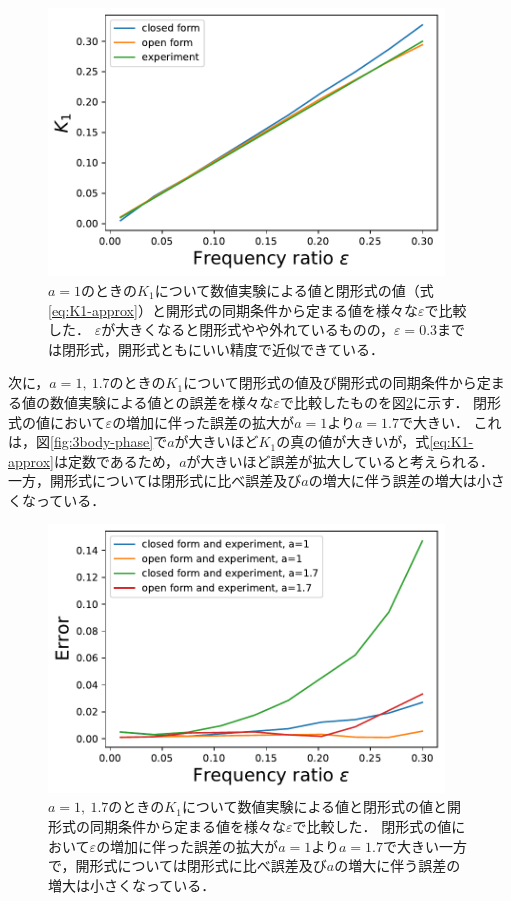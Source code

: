\documentclass[../main]{subfiles}
\begin{document}
\begin{figure}[tbp]
\centering
\includegraphics[width=105mm]{./images/k1-compare.pdf}
\centering
\caption{$a=1$のときの$K_1$について数値実験による値と閉形式の値（式\eqref{eq:K1-approx}）と開形式の同期条件から定まる値を様々な$\varepsilon$で比較した．
$\varepsilon$が大きくなると閉形式やや外れているものの，$\varepsilon=0.3$までは閉形式，開形式ともにいい精度で近似できている．}
\label{fig:k1-compare}
\end{figure}

次に，$a=1,\ 1.7$のときの$K_1$について閉形式の値及び開形式の同期条件から定まる値の数値実験による値との誤差を様々な$\varepsilon$で比較したものを図\ref{fig:k1-error}に示す．
閉形式の値において$\varepsilon$の増加に伴った誤差の拡大が$a=1$より$a=1.7$で大きい．
これは，図\ref{fig:3body-phase}で$a$が大きいほど$K_1$の真の値が大きいが，式\eqref{eq:K1-approx}は定数であるため，$a$が大きいほど誤差が拡大していると考えられる．
一方，開形式については閉形式に比べ誤差及び$a$の増大に伴う誤差の増大は小さくなっている．

\begin{figure}[tbp]
\centering
\includegraphics[width=105mm]{./images/k1-error.pdf}
\centering
\caption{$a=1,\ 1.7$のときの$K_1$について数値実験による値と閉形式の値と開形式の同期条件から定まる値を様々な$\varepsilon$で比較した．
閉形式の値において$\varepsilon$の増加に伴った誤差の拡大が$a=1$より$a=1.7$で大きい一方で，開形式については閉形式に比べ誤差及び$a$の増大に伴う誤差の増大は小さくなっている．}
\label{fig:k1-error}
\end{figure}
\end{document}
